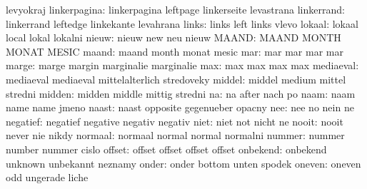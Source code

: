                       levyokraj
       linkerpagina:  linkerpagina         leftpage            linkerseite
                      levastrana
         linkerrand:  linkerrand           leftedge            linkekante
                      levahrana
              links:  links                left                links
                      vlevo
             lokaal:  lokaal               local               lokal
                      lokalni
              nieuw:  nieuw                new                 neu
                      nieuw %
              MAAND:  MAAND                MONTH               MONAT
                      MESIC
              maand:  maand                month               monat
                      mesic
                mar:  mar                  mar                 mar
                      mar
              marge:  marge                margin              marginalie
                      marginalie
                max:  max                  max                 max
                      max
          mediaeval:  mediaeval            mediaeval           mittelalterlich
                      stredoveky
             middel:  middel               medium              mittel
                      stredni
             midden:  midden               middle              mittig
                      stredni
                 na:  na                   after               nach
                      po
               naam:  naam                 name                name
                      jmeno
              naast:  naast                opposite            gegenueber
                      opacny
                nee:  nee                  no                  nein
                      ne
           negatief:  negatief             negative            negativ
                      negativ
               niet:  niet                 not                 nicht
                      ne
              nooit:  nooit                never               nie
                      nikdy
            normaal:  normaal              normal              normal
                      normalni
             nummer:  nummer               number              nummer
                      cislo
             offset:  offset               offset              offset
                      offset
           onbekend:  onbekend             unknown             unbekannt
                      neznamy
              onder:  onder                bottom              unten
                      spodek
             oneven:  oneven               odd                 ungerade
                      liche
